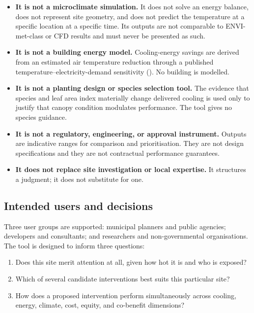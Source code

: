 \begin{itemize}
  \item \textbf{It is not a microclimate simulation.} It does not solve an
  energy balance, does not represent site geometry, and does not predict the
  temperature at a specific location at a specific time. Its outputs are not
  comparable to ENVI-met-class or CFD results and must never be presented as
  such.

  \item \textbf{It is not a building energy model.} Cooling-energy savings are
  derived from an estimated air temperature reduction through a published
  temperature--electricity-demand sensitivity (). No building
  is modelled.

  \item \textbf{It is not a planting design or species selection tool.} The
  evidence that species and leaf area index materially change delivered cooling
  \parencite{rahman2020} is used only to justify that canopy condition
  modulates performance. The tool gives no species guidance.

  \item \textbf{It is not a regulatory, engineering, or approval instrument.}
  Outputs are indicative ranges for comparison and prioritisation. They are not
  design specifications and they are not contractual performance guarantees.

  \item \textbf{It does not replace site investigation or local expertise.} It
  structures a judgment; it does not substitute for one.
\end{itemize}

\subsection{Intended users and decisions}

Three user groups are supported: municipal planners and public agencies;
developers and consultants; and researchers and non-governmental
organisations. The tool is designed to inform three questions:

\begin{enumerate}
  \item Does this site merit attention at all, given how hot it is and who is
  exposed?
  \item Which of several candidate interventions best suits this particular
  site?
  \item How does a proposed intervention perform simultaneously across cooling,
  energy, climate, cost, equity, and co-benefit dimensions?
\end{enumerate}

